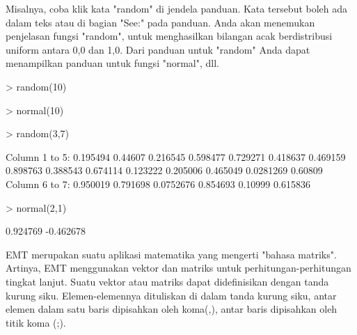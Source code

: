 \documentclass[a4paper,10pt]{article}
\begin{document}
\begin{eulernotebook}
\begin{eulercomment}
\begin{eulercomment}
\begin{eulercomment}
Misalnya, coba klik kata "random" di jendela panduan. Kata tersebut
boleh ada dalam teks atau di bagian "See:" pada panduan. Anda akan
menemukan penjelasan fungsi "random", untuk menghasilkan bilangan acak
berdistribusi uniform antara 0,0 dan 1,0. Dari panduan untuk "random"
Anda dapat menampilkan panduan untuk fungsi "normal", dll.
\end{eulercomment}
\begin{eulerprompt}
> random(10)
\end{eulerprompt}
\begin{euleroutput}
  [0.536137,  0.493453,  0.601344,  0.659461,  0.967468,  0.193151,
  0.935921,  0.0728753,  0.988966,  0.0104376]
\end{euleroutput}
\begin{eulerprompt}
> normal(10)
\end{eulerprompt}
\begin{euleroutput}
  [-2.20095,  0.328981,  -0.260813,  -1.21726,  -0.86474,  -0.577711,
  1.64827,  -0.178411,  -1.27766,  -1.16138]
\end{euleroutput}
\begin{eulerprompt}
> random(3,7)
\end{eulerprompt}
\begin{euleroutput}
  Column 1 to 5:
       0.195494       0.44607      0.216545      0.598477      0.729271 
       0.418637      0.469159      0.898763      0.388543      0.674114 
       0.123222      0.205006      0.465049     0.0281269       0.60809 
  Column 6 to 7:
       0.950019      0.791698 
      0.0752676      0.854693 
        0.10999      0.615836 
\end{euleroutput}
\begin{eulerprompt}
> normal(2,1)
\end{eulerprompt}
\begin{euleroutput}
       0.924769 
      -0.462678 
\end{euleroutput}
\begin{eulercomment}
EMT merupakan suatu aplikasi matematika yang mengerti "bahasa
matriks". Artinya, EMT menggunakan vektor dan matriks untuk
perhitungan-perhitungan tingkat lanjut. Suatu vektor atau matriks
dapat didefinisikan dengan tanda kurung siku. Elemen-elemennya
dituliskan di dalam tanda kurung siku, antar elemen dalam satu baris
dipisahkan oleh koma(,), antar baris dipisahkan oleh titik koma (;).


\end{eulercomment}
\end{eulercomment}
\end{eulercomment}
\end{eulernotebook}
\end{document}
